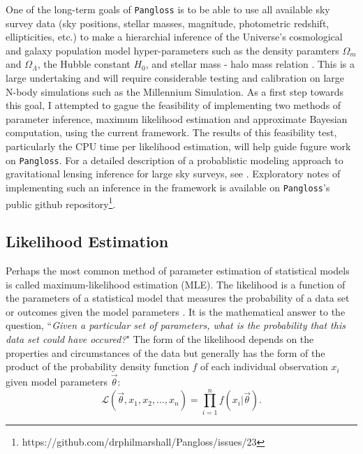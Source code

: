 \documentclass[%
 reprint,
 amsmath,amssymb,
 aps,nofootinbib
]{revtex4-1}
\begin{document}
One of the long-term goals of \texttt{Pangloss} is to be able to use all available sky survey data (sky positions, stellar masses, magnitude, photometric redshift, ellipticities, etc.) to make a hierarchial inference of the Universe's cosmological and galaxy population model hyper-parameters such as the density paramters $\Omega_m$ and $\Omega_\Lambda$, the Hubble constant $H_0$, and stellar mass - halo mass relation \cite{smhr}. This is a large undertaking and will require considerable testing and calibration on large N-body simulations such as the Millennium Simulation. As a first step towards this goal, I attempted to gague the feasibility of implementing two methods of parameter inference, maximum likelihood estimation and approximate Bayesian computation, using the current framework. The results of this feasibility test, particularly the CPU time per likelihood estimation, will help guide fugure work on \texttt{Pangloss}. For a detailed description of a probablistic modeling approach to gravitational lensing inference for large sky surveys, see \cite{hierarchial_inference}. Exploratory notes of implementing such an inference in the framework is available on \texttt{Pangloss}'s public github repository\footnote{https://github.com/drphilmarshall/Pangloss/issues/23}.\\


\subsection{Likelihood Estimation} \label{mle}

Perhaps the most common method of parameter estimation of statistical models is called maximum-likelihood estimation (MLE). The likelihood is a function of the parameters of a statistical model that measures the probability of a data set or outcomes given the model parameters \cite{bayes_in_sky}. It is the mathematical answer to the question, ``\textit{Given a particular set of parameters, what is the probability that this data set could have occured?}" The form of the likelihood depends on the properties and circumstances of the data but generally has the form of the product of the probability density function $f$ of each individual observation $x_i$ given model parameters $\vec{\theta}$:
\begin{equation}
\mathcal{L}(\vec{\theta},x_1,x_2,\ldots,x_n)=\prod_{i=1}^nf(x_i|\vec{\theta}).
\end{equation}
\end{document}
